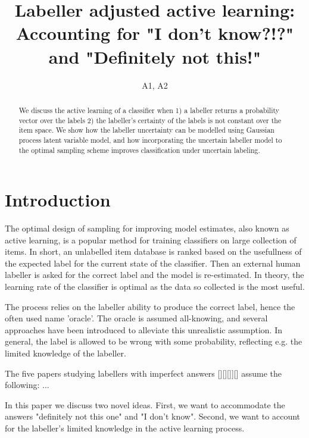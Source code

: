 \documentclass[10pt, onecolumn]{article}
\begin{document}
\title{Labeller adjusted active learning: Accounting for "I
  don't know?!?" and "Definitely not this!"}
\author{A1, A2}
\maketitle


\begin{abstract}
We discuss the active learning of a classifier when 1) a labeller
returns a probability vector over the labels 2) the labeller's
certainty of the labels is not constant over the item space. We show
how the labeller uncertainty can be modelled using Gaussian process
latent variable model, and how incorporating the uncertain labeller
model to the optimal sampling scheme improves classification under
uncertain labeling.
\end{abstract}


\section{Introduction}

The optimal design of sampling for improving model estimates, also
known as active learning, is a popular method for training classifiers
on large collection of items. In short, an unlabelled item database is
ranked based on the usefullness of the expected label for the current
state of the classifier. Then an external human labeller is asked for
the correct label and the model is re-estimated. In theory, the
learning rate of the classifier is optimal as the data so collected is
the most useful. 

The process relies on the labeller ability to produce the correct
label, hence the often used name 'oracle'. The oracle is assumed
all-knowing, and several approaches have been introduced to alleviate
this unrealistic assumption. In general, the label is allowed to be
wrong with some probability, reflecting e.g. the limited knowledge of
the labeller.

The five papers studying labellers with imperfect answers [][][]][]
assume the following: ... 


In this paper we discuss two novel ideas. First, we want to
accommodate the answers "definitely not this one" and "I don't
know". Second, we want to account for the labeller's limited knowledge in
the active learning process. 
\end{document}
